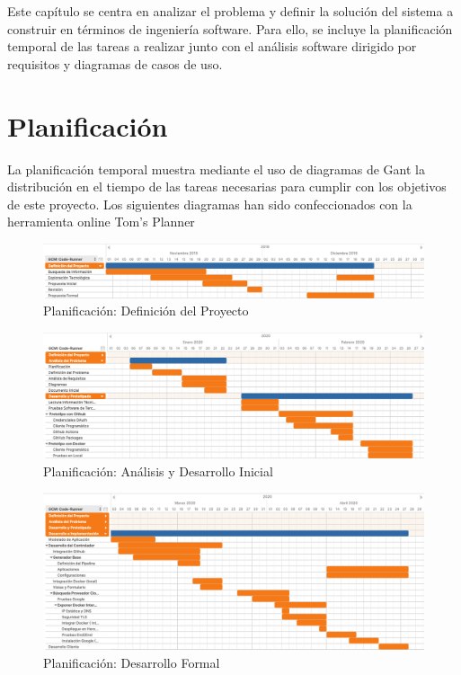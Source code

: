 \documentclass[a4paper,11pt]{book}
\begin{document}
Este capítulo se centra en analizar el problema y definir la solución del sistema a construir en términos de ingeniería software. Para ello, se incluye la planificación temporal de las tareas a realizar junto con el análisis software dirigido por requisitos y diagramas de casos de uso.

\section{Planificación}

La planificación temporal muestra mediante el uso de diagramas de Gant la distribución en el tiempo de las tareas necesarias para cumplir con los objetivos de este proyecto. Los siguientes diagramas han sido confeccionados con la herramienta online Tom's Planner~\cite{tom}

\begin{figure}[H]
\centering
\includegraphics[scale=0.20]{imagenes/gant1.png}
\caption{ Planificación: Definición del Proyecto}
\end{figure}

\begin{figure}[H]
\centering
\includegraphics[scale=0.20]{imagenes/gant2.png}
\caption{ Planificación: Análisis y Desarrollo Inicial }
\end{figure}

\begin{figure}[H]
\centering
\includegraphics[scale=0.20]{imagenes/gant3.png}
\caption{ Planificación: Desarrollo Formal}
\end{figure}
\end{document}
